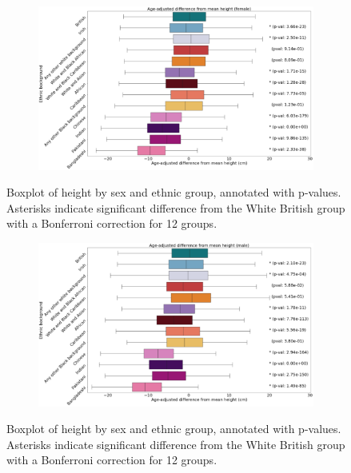 \documentclass[12pt]{pnas-new}
\begin{document}
\begin{figure}
    \centering
    \begin{subfigure}{\textwidth}
    \includegraphics[width=\textwidth]{images/female_height_boxplot_annotated.pdf}
    \end{subfigure}
    \caption{Boxplot of height by sex and ethnic group, annotated with p-values. Asterisks indicate significant difference from the White British group with a Bonferroni correction for 12 groups.}
    \label{fig:supp_box_height_f}
\end{figure}

\begin{figure}
    \centering
    \begin{subfigure}{\textwidth}
    \includegraphics[width=\textwidth]{images/male_height_boxplot_annotated.pdf}
    \end{subfigure}
    \caption{Boxplot of height by sex and ethnic group, annotated with p-values. Asterisks indicate significant difference from the White British group with a Bonferroni correction for 12 groups.}
    \label{fig:supp_box_height_m}
\end{figure}
\end{document}
